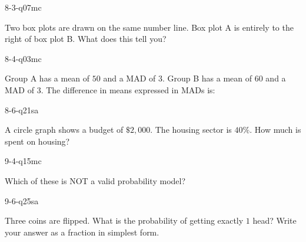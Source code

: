 \begin{practiceQuestion}{8-3-q07}{mc}
\begin{questionText}
Two box plots are drawn on the same number line. Box plot A is entirely to the right of box plot B. What does this tell you?
\end{questionText}
\end{practiceQuestion}

\begin{practiceQuestion}{8-4-q03}{mc}
\begin{questionText}
Group A has a mean of $50$ and a MAD of $3$. Group B has a mean of $60$ and a MAD of $3$. The difference in means expressed in MADs is:
\end{questionText}
\end{practiceQuestion}

\begin{practiceQuestion}{8-6-q21}{sa}
\begin{questionText}
A circle graph shows a budget of $\$2{,}000$. The housing sector is $40\%$. How much is spent on housing?
\end{questionText}
\end{practiceQuestion}

\begin{practiceQuestion}{9-4-q15}{mc}
\begin{questionText}
Which of these is NOT a valid probability model?
\end{questionText}
\end{practiceQuestion}

\begin{practiceQuestion}{9-6-q25}{sa}
\begin{questionText}
Three coins are flipped. What is the probability of getting exactly $1$ head? Write your answer as a fraction in simplest form.
\end{questionText}
\end{practiceQuestion}

